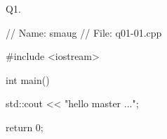 


\renewcommand\TITLE{Quiz 01-01 Solution}


\topmatter

Q1. 
\begin{console}
// Name: smaug
// File: q01-01.cpp

#include <iostream>

int main()
{
    std::cout << "hello master ...\n";

    return 0;
}
\end{console}

